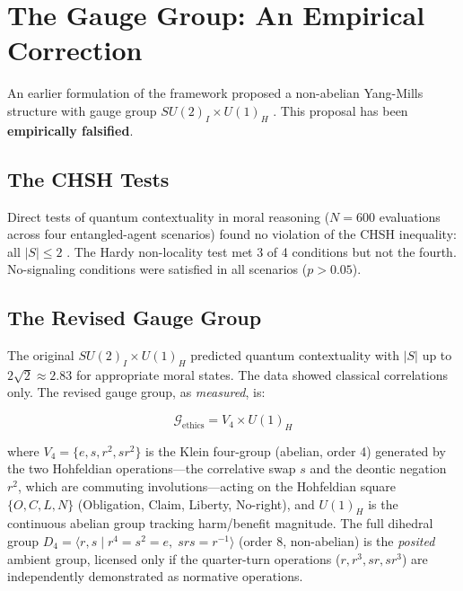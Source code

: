 \documentclass[12pt]{article}
\theoremstyle{definition}
\theoremstyle{remark}
\newcommand{\G}{\mathcal{G}}
\begin{document}
\section{The Gauge Group: An Empirical Correction}
\label{sec:gauge}

An earlier formulation of the framework proposed a non-abelian Yang-Mills structure with gauge group $SU(2)_I \times U(1)_H$ \citep{yang1954}. This proposal has been \textbf{empirically falsified}.

\subsection{The CHSH Tests}

Direct tests of quantum contextuality in moral reasoning ($N = 600$ evaluations across four entangled-agent scenarios) found no violation of the CHSH inequality: all $|S| \leq 2$ \citep[\S12.9]{anonymous2026ge}. The Hardy non-locality test met 3 of 4 conditions but not the fourth. No-signaling conditions were satisfied in all scenarios ($p > 0.05$).

\subsection{The Revised Gauge Group}

The original $SU(2)_I \times U(1)_H$ predicted quantum contextuality with $|S|$ up to $2\sqrt{2} \approx 2.83$ for appropriate moral states. The data showed classical correlations only. The revised gauge group, as \emph{measured}, is:

\begin{equation}
\boxed{\G_{\text{ethics}} = V_4 \times U(1)_H}
\end{equation}

where $V_4 = \{e, s, r^2, sr^2\}$ is the Klein four-group (abelian, order 4) generated by the two Hohfeldian operations---the correlative swap $s$ and the deontic negation $r^2$, which are commuting involutions---acting on the Hohfeldian square $\{O, C, L, N\}$ (Obligation, Claim, Liberty, No-right), and $U(1)_H$ is the continuous abelian group tracking harm/benefit magnitude. The full dihedral group $D_4 = \langle r, s \mid r^4 = s^2 = e,\; srs = r^{-1} \rangle$ (order 8, non-abelian) is the \emph{posited} ambient group, licensed only if the quarter-turn operations ($r, r^3, sr, sr^3$) are independently demonstrated as normative operations.
\end{document}
